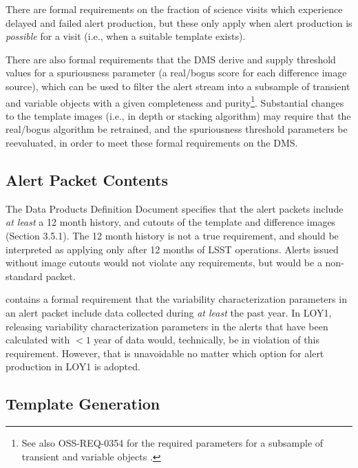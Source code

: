 \documentclass[DM,lsstdraft,toc]{lsstdoc}
\begin{document}
There are formal requirements on the fraction of science visits which experience delayed and failed alert production, but these only apply when alert production is {\em possible} for a visit (i.e., when a suitable template exists).

There are also formal requirements that the DMS derive and supply threshold values for a spuriousness parameter (a real/bogus score for each difference image source), which can be used to filter the alert stream into a subsample of transient and variable objects with a given completeness and purity\footnote{See also OSS-REQ-0354 for the required parameters for a subsample of transient and variable objects .}. Substantial changes to the template images (i.e., in depth or stacking algorithm) may require that the real/bogus algorithm be retrained, and the spuriousness threshold parameters be reevaluated, in order to meet these formal requirements on the DMS.

\subsection{Alert Packet Contents}\label{ssec:req_apc}

The Data Products Definition Document  specifies that the alert packets include {\em at least} a 12 month history, and cutouts of the template and difference images (Section 3.5.1). The 12 month history is not a true requirement, and should be interpreted as applying only after 12 months of LSST operations. Alerts issued without image cutouts would not violate any requirements, but would be a non-standard packet. 

 contains a formal requirement that the variability characterization parameters in an alert packet include data collected during {\em at least} the past year. In LOY1, releasing variability characterization parameters in the alerts that have been calculated with $<1$ year of data would, technically, be in violation of this requirement. However, that is unavoidable no matter which option for alert production in LOY1 is adopted.

\subsection{Template Generation}\label{ssec:req_temp}
\end{document}
